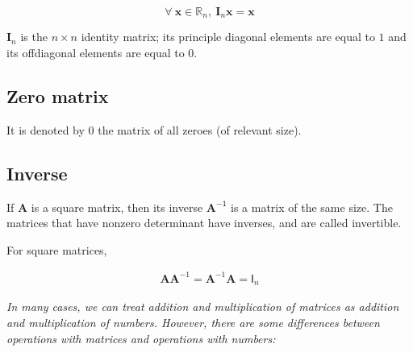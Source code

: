 \documentclass[12pt]{article}
\begin{document}
\begin{equation}
\forall\ \mathbf{x}\in\mathbb{R}_n,\ \mathbf{I}_{n}\mathbf{x} = \mathbf{x}
\end{equation}

$\mathbf{I}_{n}$ is the $n\times n$ identity matrix; its principle diagonal elements are equal to $1$ 
and its offdiagonal elements are equal to $0$.

\subsection{Zero matrix}
It is denoted by $0$ the matrix of all zeroes (of relevant size).

\subsection{Inverse}
If $\mathbf{A}$ is a square matrix, then its inverse $\mathbf{A}^{\mathsf{-1}}$ is a matrix of the same size. The matrices that have nonzero determinant have inverses, and are called invertible.

For square matrices,

\begin{align}
\mathbf{A}\mathbf{A}^{-1}=\mathbf{A}^{-1}\mathbf{A}=\mathsf{I}_{n}
\end{align}

\textit{In many cases, we can treat addition and multiplication of matrices as addition and multiplication of numbers. However, there are some differences between operations with matrices and operations with numbers:}

\end{document}
